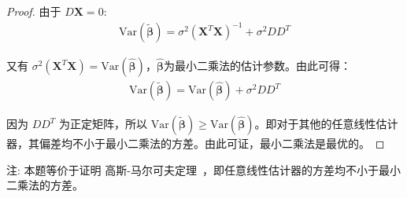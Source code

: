 \documentclass[UTF8]{article} %
\newcommand{\TildeBeta}{\tilde{\boldsymbol{\beta}}}
\newcommand{\HatBeta}{\hat{\boldsymbol{\beta}}}
\begin{document}
\begin{proof}
        由于 $D \mathbf{X} = 0$:
        \begin{align}
            \mathrm{Var}(\TildeBeta) =  \sigma^{2}\left(\mathbf{X}^T \mathbf{X}\right)^{-1} + \sigma^{2} D D^T
        \end{align}

        又有 $\sigma^{2} (\mathbf{X}^T \mathbf{X}) = \mathrm{Var}(\HatBeta)$，$\HatBeta$为最小二乘法的估计参数。由此可得：
        \begin{align}
            \mathrm{Var}(\TildeBeta) = \mathrm{Var}(\HatBeta) + \sigma^{2} D D^T
        \end{align}

        因为 $D D^T$ 为正定矩阵，所以 $\mathrm{Var}(\TildeBeta) \geq \mathrm{Var}(\HatBeta)$。即对于其他的任意线性估计器，其偏差均不小于最小二乘法的方差。由此可证，最小二乘法是最优的。
    \end{proof}

    注: 本题等价于证明 高斯-马尔可夫定理~\cite{wiki}，即任意线性估计器的方差均不小于最小二乘法的方差。
    
    
\end{document}
